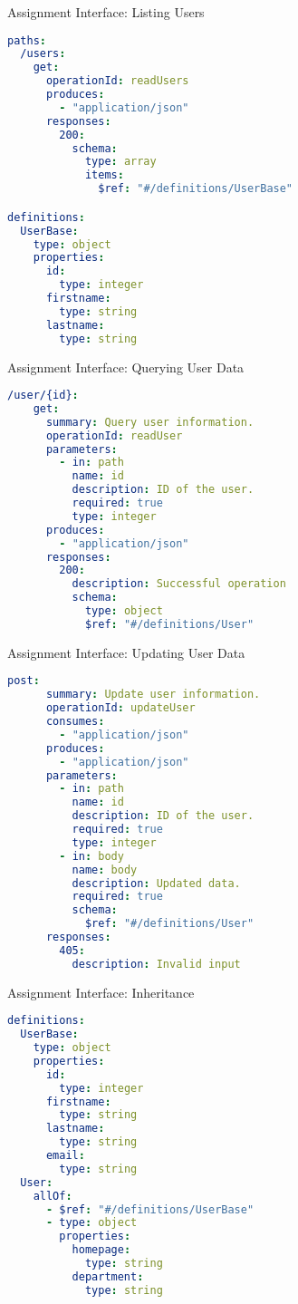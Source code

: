 \begin{frame}[fragile]{Assignment Interface: Listing Users}
\begin{lstlisting}[language=yaml,style=mini]
paths:
  /users:
    get:
      operationId: readUsers
      produces:
        - "application/json"
      responses:
        200:
          schema:
            type: array
            items:
              $ref: "#/definitions/UserBase"

definitions:
  UserBase:
    type: object
    properties:
      id:
        type: integer
      firstname:
        type: string
      lastname:
        type: string
\end{lstlisting}
\end{frame}


\begin{frame}[fragile]{Assignment Interface: Querying User Data}
\begin{lstlisting}[language=yaml,style=mini]
  /user/{id}:
    get:
      summary: Query user information.
      operationId: readUser
      parameters:
        - in: path
          name: id
          description: ID of the user.
          required: true
          type: integer
      produces:
        - "application/json"
      responses:
        200:
          description: Successful operation
          schema:
            type: object
            $ref: "#/definitions/User"
\end{lstlisting}
\end{frame}


\begin{frame}[fragile]{Assignment Interface: Updating User Data}
\begin{lstlisting}[language=yaml,style=mini]
    post:
      summary: Update user information.
      operationId: updateUser
      consumes:
        - "application/json"
      produces:
        - "application/json"
      parameters:
        - in: path
          name: id
          description: ID of the user.
          required: true
          type: integer
        - in: body
          name: body
          description: Updated data.
          required: true
          schema:
            $ref: "#/definitions/User"
      responses:
        405:
          description: Invalid input
\end{lstlisting}
\end{frame}


\begin{frame}[fragile]{Assignment Interface: Inheritance}
\begin{lstlisting}[language=yaml,style=mini]
definitions:
  UserBase:
    type: object
    properties:
      id:
        type: integer
      firstname:
        type: string
      lastname:
        type: string
      email:
        type: string
  User:
    allOf:
      - $ref: "#/definitions/UserBase"
      - type: object
        properties:
          homepage:
            type: string
          department:
            type: string
\end{lstlisting}
\end{frame}


